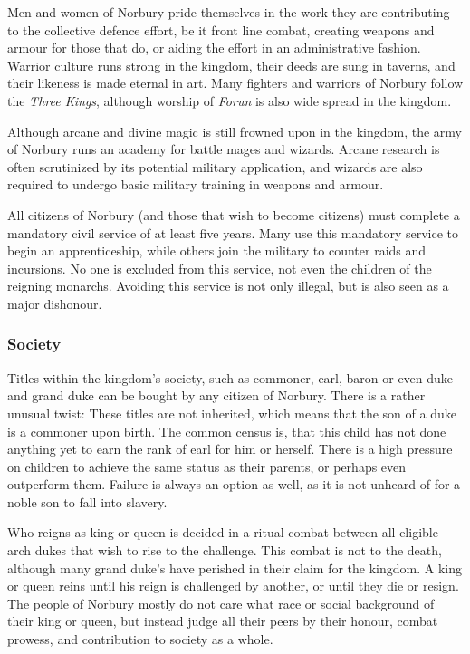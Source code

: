Men and women of Norbury pride themselves in the work they are contributing to
the collective defence effort, be it front line combat, creating weapons and
armour for those that do, or aiding the effort in an administrative
fashion. Warrior culture runs strong in the kingdom, their deeds are sung in
taverns, and their likeness is made eternal in art. Many fighters and warriors
of Norbury follow the \emph{Three Kings}, although worship of \emph{Forun} is
also wide spread in the kingdom.

Although arcane and divine magic is still frowned upon in the kingdom, the army
of Norbury runs an academy for battle mages and wizards. Arcane research is
often scrutinized by its potential military application, and wizards are also
required to undergo basic military training in weapons and armour.

All citizens of Norbury (and those that wish to become citizens) must complete
a mandatory civil service of at least five years. Many use this mandatory
service to begin an apprenticeship, while others join the military to counter
raids and incursions. No one is excluded from this service, not even the
children of the reigning monarchs. Avoiding this service is not only illegal,
but is also seen as a major dishonour.

\subsubsection{Society}

Titles within the kingdom's society, such as commoner, earl, baron or even
duke and grand duke can be bought by any citizen of Norbury. There is a rather
unusual twist: These titles are not inherited, which means that the son of a
duke is a commoner upon birth. The common census is, that this child has not
done anything yet to earn the rank of earl for him or herself. There is a high
pressure on children to achieve the same status as their parents, or perhaps
even outperform them. Failure is always an option as well, as it is not
unheard of for a noble son to fall into slavery.

Who reigns as king or queen is decided in a ritual combat between all eligible
arch dukes that wish to rise to the challenge. This combat is not to the
death, although many grand duke's have perished in their claim for the
kingdom. A king or queen reins until his reign is challenged by another, or
until they die or resign. The people of Norbury mostly do not care what race
or social background of their king or queen, but instead judge all their peers
by their honour, combat prowess, and contribution to society as a whole.

